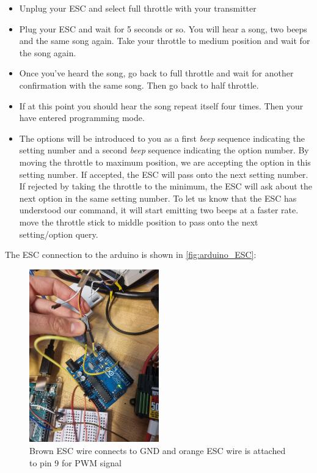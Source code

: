 \documentclass[a4paper]{article}
\begin{document}
{\begin{itemize}
	\item Unplug your ESC and select full throttle with your transmitter
	\item Plug your ESC and wait for 5 seconds or so. You will hear a song, two beeps and the same song again. Take your throttle to medium position and wait for the song again.
	\item Once you've heard the song, go back to full throttle and wait for another confirmation with the same song. Then go back to half throttle. 
	\item If at this point you should hear the song repeat itself four times. Then your have entered programming mode.
	\item The options will be introduced to you as a first \textit{beep} sequence indicating the setting number and a second \textit{beep} sequence indicating the option number. By moving the throttle to maximum position, we are accepting the option in this setting number. If accepted, the ESC will pass onto the next setting number. If rejected by taking the throttle to the minimum, the ESC will ask about the next option in the same setting number.
	To let us know that the ESC has understood our command, it will start emitting two beeps at a faster rate. move the throttle stick to middle position to pass onto the next setting/option query. 
\end{itemize}

The ESC connection to the arduino is shown in \autoref{fig:arduino_ESC}:

\begin{figure}[h!]
	\centering
	\includegraphics[width=0.5\textwidth]{arduino_ESC.jpeg}
	\caption{Brown ESC wire connects to GND and orange ESC wire is attached to pin 9 for PWM signal}
	\label{fig:arduino_ESC}
\end{figure}

}
\end{document}
